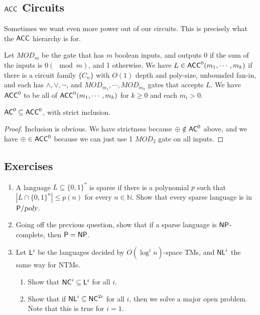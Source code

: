 \subsection{${\mathsf{ACC}}$ Circuits}
Sometimes we want even more power out of our circuits. This is precisely what the ${\mathsf{ACC}}$ hierarchy is for.
\begin{definition}
Let $MOD_m$ be the gate that has $m$ boolean inputs, and outputs 0 if the sum of the inputs is $0 (\mod m)$, and 1 otherwise. We have $L \in {\ensuremath{\mathsf{ACC}}}^0(m_1, \cdots, m_k)$ if there is a circuit family $\{C_n\}$ with $O(1)$ depth and poly-size, unbounded fan-in, and each has $\wedge, \vee, \neg$, and $MOD_{m_1}, \cdots, MOD_{m_k}$ gates that accepts $L$. We have ${\mathsf{ACC}}^0$ to be all of ${\mathsf{ACC}}^0(m_1, \cdots, m_k)$ for $k \ge 0$ and each $m_i > 0$. 
\end{definition}

\begin{theorem}
${\mathsf{AC}}^0 \subseteq {\ensuremath{\mathsf{ACC}}}^0$, with strict inclusion.
\end{theorem}

\begin{proof}
Inclusion is obvious. We have strictness because $\oplus \notin {\ensuremath{\mathsf{AC}}}^0$ above, and we have $\oplus \in {\ensuremath{\mathsf{ACC}}}^0$ because we can just use 1 $MOD_2$ gate on all inputs.
\end{proof}

\subsection*{Exercises}

\begin{enumerate}
\item A language $L \subseteq \{0, 1\}^*$ is sparse if there is a polynomial $p$ such that $|L \cap \{0, 1\}^n| \le p(n)$ for every $n \in \mathbb{N}$. Show that every sparse language is in ${\mathsf{P}}/{\textsl{poly}}$.
\item Going off the previous question, show that if a sparse language is ${\mathsf{NP}}$-complete, then ${\mathsf{P}} = {\mathsf{NP}}$.
\item Let ${\mathsf{L}}^i$ be the languages decided by $O(\log^i n)$-space TMs, and ${\mathsf{NL}}^i$ the same way for NTMs.
\begin{enumerate}
\item Show that ${\mathsf{NC}}^i \subseteq {\ensuremath{\mathsf{L}}}^i$ for all $i$.
\item Show that if ${\mathsf{NL}}^i \subseteq {\ensuremath{\mathsf{NC}}}^{2i}$ for all $i$, then we solve a major open problem. Note that this is true for $i=1$. 
\end{enumerate}
\end{enumerate}